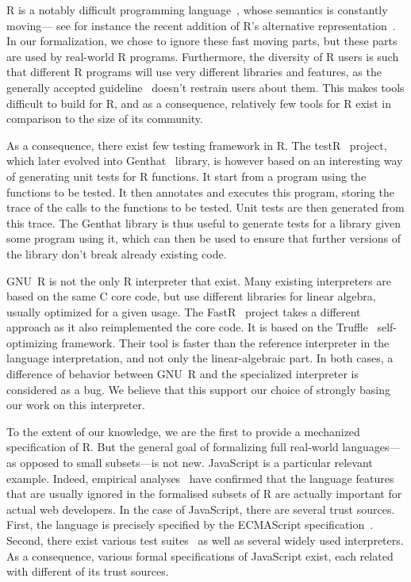 \documentclass[
    sigplan,
    10pt,
    review, %
    natbib=false %
 ]{acmart}
\begin{document}
R is a notably difficult programming language~\parencite{RInferno},
whose semantics is constantly moving---%
see for instance the recent addition
of R's alternative representation~\parencite{altrepR}.
In our formalization, we chose to ignore these fast moving parts,
but these parts are used by real-world R programs.
Furthermore, the diversity of R users is such that different R programs
will use very different libraries and features,
as the generally accepted guideline~\parencite{RGuidelines}
doesn't restrain users about them.
This makes tools difficult to build for R,
and as a consequence, relatively few tools for R exist
in comparison to the size of its community.

As a consequence,
there exist few testing framework in R.
The testR~\parencite{maj2013testr, 2014testr} project,
which later evolved into Genthat~\parencite{genthat} library,
is however based on an interesting way of generating unit tests for R functions.
It start from a program using the functions to be tested.
It then annotates and executes this program,
storing the trace of the calls to the functions to be tested.
Unit tests are then generated from this trace.
The Genthat library is thus useful to generate tests for a library
given some program using it,
which can then be used to ensure that further versions of the library
don't break already existing code.

GNU~R is not the only R interpreter that exist.
Many existing interpreters are based on the same C core code,
but use different libraries for linear algebra,
usually optimized for a given usage.
%
The FastR~\parencite{kalibera2014fast} project takes a different approach
as it also reimplemented the core code.
It is based on the Truffle~\parencite{wuerthingertruffle}
self-optimizing framework.
Their tool is faster than the reference interpreter
in the language interpretation, and not only the linear-algebraic part.
%
In both cases, a difference of behavior between GNU~R
and the specialized interpreter is considered as a bug.
We believe that this support our choice of strongly basing
our work on this interpreter.

To the extent of our knowledge,
we are the first to provide a mechanized specification of R.
But the general goal of formalizing full real-world languages---%
as opposed to small subsets---is not new.
%
JavaScript is a particular relevant example.
Indeed, empirical analyses~\parencite{RichardsHBV11}
have confirmed that the language features
that are usually ignored in the formalised subsets of R
are actually important for actual web developers.
%
In the case of JavaScript, there are several trust sources.
First, the language is precisely specified by the ECMAScript specification~\parencite{es2019}.
Second, there exist various test suites~\parencite{test262, mozillatests}
as well as several widely used interpreters.
As a consequence, various formal specifications of JavaScript exist,
each related with different of its trust sources.
\end{document}
